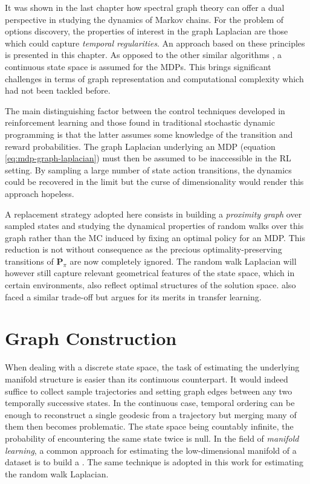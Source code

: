 
It was shown in the last chapter how spectral graph theory can offer a dual perspective
in studying the dynamics of Markov chains. For the problem of options discovery, the
properties of interest in the graph Laplacian are those which could capture
\textit{temporal regularities}. An approach based on these principles is presented in this chapter. As opposed to the other similar algorithms \cite{Menache2002, Mannor2004, Mathew2012, Bouvrie2012}, a continuous state space is assumed for the MDPs. This brings significant challenges in terms of graph representation and computational complexity which had not been tackled before.

The main distinguishing factor between the control techniques developed in
reinforcement learning and those found in traditional stochastic dynamic programming
is that the latter assumes some knowledge of the transition and reward probabilities. The graph Laplacian underlying an MDP (equation \ref{eq:mdp-graph-laplacian}) must then be assumed to be inaccessible in the RL setting. By sampling a large number of state action transitions, the dynamics could be recovered in the limit but the curse of dimensionality would render this approach hopeless.

A replacement strategy adopted here consists in building a \textit{proximity graph}
over sampled states and studying the dynamical properties of random walks over this
graph rather than the MC induced by fixing an optimal policy for an MDP. This reduction is not without consequence as the precious optimality-preserving transitions of $\mathbf{P}_\pi$ are now completely ignored. The random walk Laplacian will however still capture relevant geometrical features of the state space, which in certain environments,  also reflect optimal structures of the solution space. \cite{Mahadevan2007} also faced a similar trade-off but argues for its merits in transfer learning.

\section{Graph Construction}
\label{ref:proximitygraphs}

When dealing with a discrete state space, the task of estimating the underlying manifold structure is easier than its continuous counterpart. It would indeed suffice to collect sample trajectories and setting graph edges between any two temporally successive states. In the continuous case, temporal ordering can be enough to reconstruct a single geodesic from a trajectory but merging many of them then becomes problematic. The state space being countably infinite, the probability of encountering the same state twice is null.  In the field of \textit{manifold learning}, a common approach for estimating the low-dimensional manifold of a dataset is to build a . The same technique is adopted in this work for estimating the random walk Laplacian.

